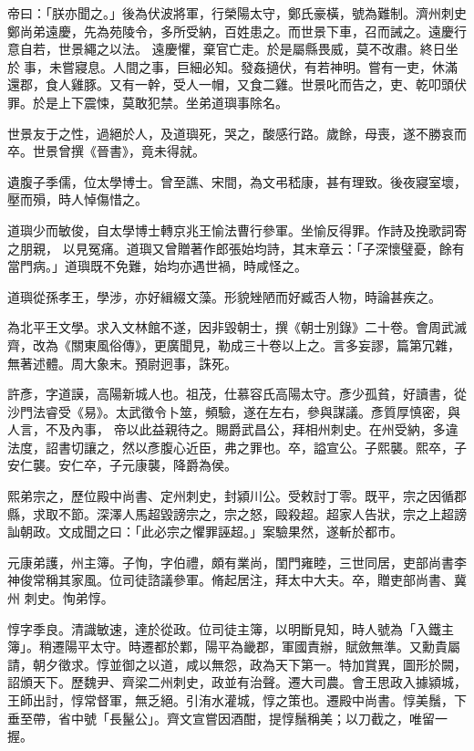 \begin{pinyinscope}
 帝曰：「朕亦聞之。」後為伏波將軍，行榮陽太守，鄭氏豪橫，號為難制。濟州刺史鄭尚弟遠慶，先為苑陵令，多所受納，百姓患之。而世景下車，召而誡之。遠慶行意自若，世景繩之以法。
 遠慶懼，棄官亡走。於是屬縣畏威，莫不改肅。終日坐於事，未嘗寢息。人間之事，巨細必知。發姦擿伏，有若神明。嘗有一吏，休滿還郡，食人雞豚。又有一幹，受人一帽，又食二雞。世景叱而告之，吏、乾叩頭伏罪。於是上下震悚，莫敢犯禁。坐弟道璵事除名。



 世景友于之性，過絕於人，及道璵死，哭之，酸感行路。歲餘，母喪，遂不勝哀而卒。世景曾撰《晉書》，竟未得就。



 遺腹子季儒，位太學博士。曾至譙、宋間，為文弔嵇康，甚有理致。後夜寢室壞，壓而殞，時人悼傷惜之。



 道璵少而敏俊，自太學博士轉京兆王愉法曹行參軍。坐愉反得罪。作詩及挽歌詞寄之朋親，
 以見冤痛。道璵又曾贈著作郎張始均詩，其末章云：「子深懷璧憂，餘有當門病。」道璵既不免難，始均亦遇世禍，時咸怪之。



 道璵從孫孝王，學涉，亦好緝綴文藻。形貌矬陋而好臧否人物，時論甚疾之。



 為北平王文學。求入文林館不遂，因非毀朝士，撰《朝士別錄》二十卷。會周武滅齊，改為《關東風俗傳》，更廣聞見，勒成三十卷以上之。言多妄謬，篇第冗雜，無著述體。周大象末。預尉迥事，誅死。



 許彥，字道謨，高陽新城人也。祖茂，仕慕容氏高陽太守。彥少孤貧，好讀書，從沙門法睿受《易》。太武徵令卜筮，頻驗，遂在左右，參與謀議。彥質厚慎密，與人言，不及內事，
 帝以此益親待之。賜爵武昌公，拜相州刺史。在州受納，多違法度，詔書切讓之，然以彥腹心近臣，弗之罪也。卒，謚宣公。子熙襲。熙卒，子安仁襲。安仁卒，子元康襲，降爵為侯。



 熙弟宗之，歷位殿中尚書、定州刺史，封潁川公。受敕討丁零。既平，宗之因循郡縣，求取不節。深澤人馬超毀謗宗之，宗之怒，毆殺超。超家人告狀，宗之上超謗訕朝政。文成聞之曰：「此必宗之懼罪誣超。」案驗果然，遂斬於都市。



 元康弟護，州主簿。子恂，字伯禮，頗有業尚，閨門雍睦，三世同居，吏部尚書李神俊常稱其家風。位司徒諮議參軍。脩起居注，拜太中大夫。卒，贈吏部尚書、冀州
 刺史。恂弟惇。



 惇字季良。清識敏速，達於從政。位司徒主簿，以明斷見知，時人號為「入鐵主簿」。稍遷陽平太守。時遷都於鄴，陽平為畿郡，軍國責辦，賦斂無準。又勳貴屬請，朝夕徵求。惇並御之以道，咸以無怨，政為天下第一。特加賞異，圖形於闕，詔頒天下。歷魏尹、齊梁二州刺史，政並有治聲。遷大司農。會王思政入據潁城，王師出討，惇常督軍，無乏絕。引洧水灌城，惇之策也。遷殿中尚書。惇美鬚，下垂至帶，省中號「長鬣公」。齊文宣嘗因酒酣，提惇鬚稱美；以刀截之，唯留一握。




\end{pinyinscope}
